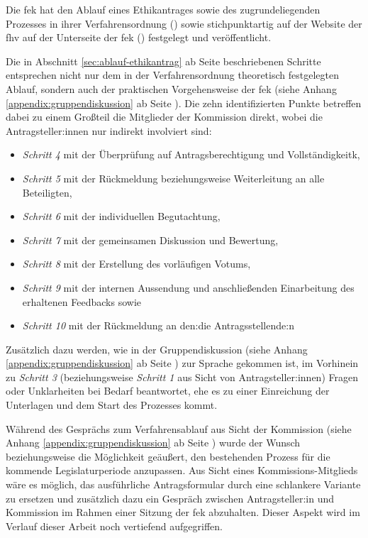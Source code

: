 \documentclass[a4paper,12pt,twoside]{scrreprt}
\begin{document}
Die \acl{fek} hat den Ablauf eines Ethikantrages sowie des zugrundeliegenden Prozesses in ihrer Verfahrensordnung (\cite{forschungsethik-kommission_der_fachhochschule_vorarlberg_verfahrensordnung_2020}) sowie stichpunktartig auf der Website der \ac{fhv} auf der Unterseite der \ac{fek} (\cite{fachhochschule_vorarlberg_gmbh_forschungsethik-kommission_2021}) festgelegt und veröffentlicht.

Die in Abschnitt \ref{sec:ablauf-ethikantrag} ab Seite \pageref{sec:ablauf-ethikantrag} beschriebenen Schritte entsprechen nicht nur dem in der Verfahrensordnung theoretisch festgelegten Ablauf, sondern auch der praktischen Vorgehensweise der \ac{fek} (siehe Anhang \ref{appendix:gruppendiskussion} ab Seite \pageref{appendix:gruppendiskussion}). Die zehn identifizierten Punkte betreffen dabei zu einem Großteil die Mitglieder der Kommission direkt, wobei die Antragsteller:innen nur indirekt involviert sind:
\begin{itemize}
    \item \textit{Schritt 4} mit der Überprüfung auf Antragsberechtigung und Vollständigkeitk,
    \item \textit{Schritt 5} mit der Rückmeldung beziehungsweise Weiterleitung an alle Beteiligten,
    \item \textit{Schritt 6} mit der individuellen Begutachtung,
    \item \textit{Schritt 7} mit der gemeinsamen Diskussion und Bewertung,
    \item \textit{Schritt 8} mit der Erstellung des vorläufigen Votums,
    \item \textit{Schritt 9} mit der internen Aussendung und anschließenden Einarbeitung des erhaltenen Feedbacks sowie
    \item \textit{Schritt 10} mit der Rückmeldung an den:die Antragsstellende:n
\end{itemize}

\noindent Zusätzlich dazu werden, wie in der Gruppendiskussion (siehe Anhang \ref{appendix:gruppendiskussion} ab Seite \pageref{appendix:gruppendiskussion}) zur Sprache gekommen ist, im Vorhinein zu \textit{Schritt 3} (beziehungsweise \textit{Schritt 1} aus Sicht von Antragsteller:innen) Fragen oder Unklarheiten bei Bedarf beantwortet, ehe es zu einer Einreichung der Unterlagen und dem Start des Prozesses kommt.

\medskip

Während des Gesprächs zum Verfahrensablauf aus Sicht der Kommission (siehe Anhang \ref{appendix:gruppendiskussion} ab Seite \pageref{appendix:gruppendiskussion}) wurde der Wunsch beziehungsweise die Möglichkeit geäußert, den bestehenden Prozess für die kommende Legislaturperiode anzupassen. Aus Sicht eines Kommissions-Mitglieds wäre es möglich, das ausführliche Antragsformular durch eine schlankere Variante zu ersetzen und zusätzlich dazu ein Gespräch zwischen Antragsteller:in und Kommission im Rahmen einer Sitzung der \ac{fek} abzuhalten. Dieser Aspekt wird im Verlauf dieser Arbeit noch vertiefend aufgegriffen.
\end{document}
